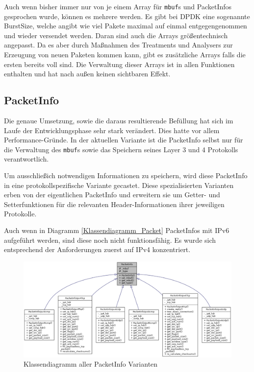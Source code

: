 \documentclass[../review_2.tex]{subfiles}
\begin{document}
Auch wenn bisher immer nur von je einem Array für \texttt{mbuf}s und PacketInfos gesprochen wurde, können es mehrere werden. Es gibt bei DPDK eine sogenannte BurstSize, welche angibt wie viel Pakete maximal auf einmal entgegengenommen und wieder versendet werden. Daran sind auch die Arrays größentechnisch angepasst. Da es aber durch Maßnahmen des Treatments und Analysers zur Erzeugung von neuen Paketen kommen kann, gibt es zusätzliche Arrays falls die ersten bereits voll sind. Die Verwaltung dieser Arrays ist in allen Funktionen enthalten und hat nach außen keinen sichtbaren Effekt.

\subsection{PacketInfo}
Die genaue Umsetzung, sowie die daraus resultierende Befüllung hat sich im Laufe der Entwicklungsphase sehr stark verändert. Dies hatte vor allem Performance-Gründe. In der aktuellen Variante ist die PacketInfo selbst nur für die Verwaltung des \texttt{mbuf}s sowie das Speichern seines Layer 3 und 4 Protokolls verantwortlich. 

Um ausschließich notwendigen Informationen zu speichern, wird diese PacketInfo in eine protokollspezifische Variante gecastet. Diese spezialisierten Varianten erben von der eigentlichen PacketInfo und erweitern sie um Getter- und Setterfunktionen für die relevanten Header-Informationen ihrer jeweiligen Protokolle.

Auch wenn in Diagramm \ref{Klassendiagramm_Packet} PacketInfos mit IPv6 aufgeführt werden, sind diese noch nicht funktionsfähig. Es wurde sich entsprechend der Anforderungen zuerst auf IPv4 konzentriert.

\begin{figure}
	\centering
	\includegraphics[width=\linewidth]{img/PacketInfoInheritance.pdf}
	\caption{Klassendiagramm aller PacketInfo Varianten}
	\label{Klassendiagramm_PacketInfo}
\end{figure}
\end{document}

